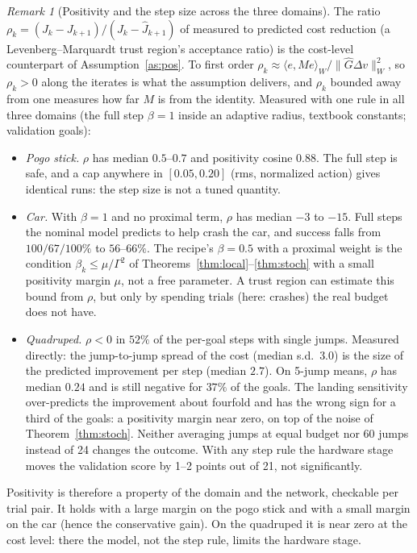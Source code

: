\documentclass[11pt]{article}
\theoremstyle{definition}
\theoremstyle{remark}
\newtheorem{remark}[theorem]{Remark}
\newcommand{\ip}[2]{\langle #1,#2\rangle_W}
\newcommand{\nW}[1]{\lVert #1\rVert_W}
\newcommand{\Ghat}{\widehat G}
\begin{document}
\begin{remark}[Positivity and the step size across the three domains]\label{rem:posdomains}
The ratio $\rho_k=(J_k-J_{k+1})/(J_k-\hat J_{k+1})$ of measured to predicted cost reduction (a Levenberg--Marquardt trust
region's acceptance ratio) is the cost-level counterpart of Assumption~\ref{as:pos}. To first order
$\rho_k\approx\ip{e}{Me}/\nW{\Ghat\Delta v}^2$, so $\rho_k>0$ along the iterates is what the assumption delivers, and
$\rho_k$ bounded away from one measures how far $M$ is from the identity. Measured with one rule in all three domains
(the full step $\beta=1$ inside an adaptive radius, textbook constants; validation goals):
\begin{itemize}
\item \emph{Pogo stick.} $\rho$ has median $0.5$--$0.7$ and positivity cosine $0.88$. The full step is safe, and a cap
  anywhere in $[0.05,0.20]$ (rms, normalized action) gives identical runs: the step size is not a tuned quantity.
\item \emph{Car.} With $\beta=1$ and no proximal term, $\rho$ has median $-3$ to $-15$. Full steps the nominal model predicts
  to help crash the car, and success falls from $100/67/100\%$ to $56$--$66\%$. The recipe's $\beta=0.5$ with a proximal
  weight is the condition $\beta_k\le\mu/\Gamma^2$ of Theorems~\ref{thm:local}--\ref{thm:stoch} with a small positivity
  margin $\mu$, not a free parameter. A trust region can estimate this bound from $\rho$, but only by spending trials (here:
  crashes) the real budget does not have.
\item \emph{Quadruped.} $\rho<0$ in $52\%$ of the per-goal steps with single jumps. Measured directly: the
  jump-to-jump spread of the cost (median s.d.\ $3.0$) is the size of the predicted improvement per step (median
  $2.7$). On 5-jump means, $\rho$ has median $0.24$ and is still negative for $37\%$ of the goals. The landing
  sensitivity over-predicts the improvement about fourfold and has the wrong sign for a third of the goals: a positivity
  margin near zero, on top of the noise of Theorem~\ref{thm:stoch}. Neither averaging jumps at equal budget nor 60
  jumps instead of 24 changes the outcome. With any step rule the hardware stage moves the validation score by 1--2
  points out of 21, not significantly.
\end{itemize}
Positivity is therefore a property of the domain and the network, checkable per trial pair. It holds with a large
margin on the pogo stick and with a small margin on the car (hence the conservative gain). On the quadruped it is
near zero at the cost level: there the model, not the step rule, limits the hardware stage.
\end{remark}
\end{document}
